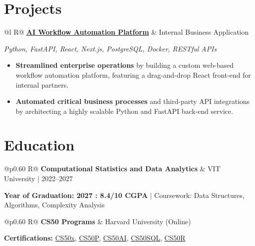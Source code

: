 \documentclass[a4paper,10pt]{article}
\newcommand{\ulink}[2]{\href{#1}{#2}}
\newcommand{\subheading}[1]{{\color[HTML]{0A0A0A}\fontsize{12}{14}\selectfont\bfseries #1}}
\newcommand{\techstack}[1]{{\color[HTML]{5C5C5C}\fontsize{10.5}{12.5}\selectfont\itshape #1}}
\newcommand{\meta}[1]{{\color[HTML]{5C5C5C}\fontsize{10.5}{12.5}\selectfont #1}}
\begin{document}
\section{Projects}
\vspace{2pt}

\begin{tabularx}{\linewidth}{@{}l R@{}}
\subheading{\ulink{https://github.com/su-jin1425/AI-Workflow-Automation-Platform}{AI Workflow Automation Platform}} & \meta{Internal Business Application}
\end{tabularx}
\techstack{Python, FastAPI, React, Next.js, PostgreSQL, Docker, RESTful APIs}
\begin{itemize}[nosep, leftmargin=1.5em, itemsep=2pt, topsep=2pt]
  \item {\color[HTML]{0A0A0A}\fontsize{11}{14}\selectfont \textbf{Streamlined enterprise operations} by building a custom web-based workflow automation platform, featuring a drag-and-drop React front-end for internal partners.}
  \item {\color[HTML]{0A0A0A}\fontsize{11}{14}\selectfont \textbf{Automated critical business processes} and third-party API integrations by architecting a highly scalable Python and FastAPI back-end service.}
\end{itemize}

\section{Education}
\vspace{2pt}

\begin{tabularx}{\linewidth}{@{}p{0.60\linewidth} R@{}}
\subheading{Computational Statistics and Data Analytics} & \meta{VIT University $|$ 2022--2027}
\end{tabularx}
{\color[HTML]{3A3A3A}\fontsize{11}{14}\selectfont \textbf{Year of Graduation: 2027 : 8.4/10 CGPA} $|$ Coursework: Data Structures, Algorithms, Complexity Analysis}

\begin{tabularx}{\linewidth}{@{}p{0.60\linewidth} R@{}}
\subheading{CS50 Programs} & \meta{Harvard University (Online)}
\end{tabularx}
{\color[HTML]{3A3A3A}\fontsize{11}{14}\selectfont \textbf{Certifications:} \ulink{https://cs50.harvard.edu/certificates/b14b78df-e05c-413e-a607-1dd27303053a}{CS50x}, \ulink{https://cs50.harvard.edu/certificates/32477052-9db4-49c4-a5a4-d7e58429ca2c}{CS50P}, \ulink{https://cs50.harvard.edu/certificates/9cdb4d4a-1250-4f8e-9fd7-191864e0f919}{CS50AI}, \ulink{https://cs50.harvard.edu/certificates/bc486f24-f085-4e61-8536-80940b97a1b9}{CS50SQL}, \ulink{https://cs50.harvard.edu/certificates/666838e6-a053-4d82-b179-a60fe745fd84}{CS50R}}
\end{document}
